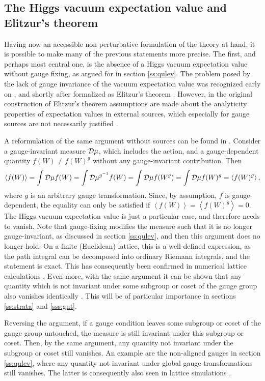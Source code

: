 \documentclass[final,12pt]{article}
\newcommand*{\no}{\noindent}
\newcommand*{\be}{\begin{equation}}
\newcommand*{\ee}{\end{equation}}
\newcommand*{\1}{1\!\!\!\bot}
\newcommand*{\la}{\left\langle}
\newcommand*{\ra}{\right\rangle}
\begin{document}
\subsection{The Higgs vacuum expectation value and Elitzur's theorem}\label{ss:vev}

Having now an accessible non-perturbative formulation of the theory at hand, it is possible to make many of the previous statements more precise. The first, and perhaps most central one, is the absence of a Higgs vacuum expectation value without gauge fixing, as argued for in section \ref{ss:qulev}. The problem posed by the lack of gauge invariance of the vacuum expectation value was recognized early on \cite{Lee:1974zg,Fischler:1974ue}, and shortly after formalized as Elitzur's theorem \cite{Elitzur:1975im}. However, in the original construction of Elitzur's theorem assumptions are made about the analyticity properties of expectation values in external sources, which especially for gauge sources are not necessarily justified \cite{Maas:2013sca}.

A reformulation of the same argument without sources can be found in \cite{Frohlich:1980gj}. Consider a gauge-invariant measure ${\cal D}\mu$, which includes the action, and a gauge-dependent quantity $f(W)\neq f(W)^g$ without any gauge-invariant contribution. Then \cite{Frohlich:1980gj}
\be
\la f(W)\ra=\int{\cal D}\mu f(W)=\int{\cal D}\mu^{g^{-1}}f(W)=\int{\cal D}\mu f(W^{g})=\int{\cal D}\mu f(W)^g=\la f(W)^g\ra\label{fmsel},
\ee
\no where $g$ is an arbitrary gauge transformation. Since, by assumption, $f$ is gauge-dependent, the equality can only be satisfied if $\la f(W)\ra=\la f(W)^g\ra=0$. The Higgs vacuum expectation value is just a particular case, and therefore needs to vanish. Note that gauge-fixing modifies the measure such that it is no longer gauge-invariant, as discussed in section \ref{ss:qulev}, and then this argument does no longer hold. On a finite (Euclidean) lattice, this is a well-defined expression, as the path integral can be decomposed into ordinary Riemann integrals, and the statement is exact. This has consequently been confirmed in numerical lattice calculations \cite{Caudy:2007sf,Maas:2012ct}. Even more, with the same argument it can be shown that any quantity which is not invariant under some subgroup or coset of the gauge group also vanishes identically \cite{Frohlich:1980gj}. This will be of particular importance in sections \ref{ss:strata} and \ref{sss:gut}.

Reversing the argument, if a gauge condition leaves some subgroup or coset of the gauge group untouched, the measure is still invariant under this subgroup or coset. Then, by the same argument, any quantity not invariant under the subgroup or coset still vanishes. An example are the non-aligned gauges in section \ref{ss:qulev}, where any quantity not invariant under global gauge transformations still vanishes. The latter is consequently also seen in lattice simulations \cite{Maas:2012ct}.
\end{document}
